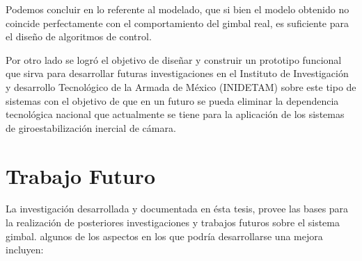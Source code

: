 Podemos concluir en lo referente al modelado, que si bien el modelo obtenido no coincide perfectamente con el comportamiento del gimbal real, es suficiente para el dise\~{n}o de algoritmos de control. 

Por otro lado se logr\'{o} el objetivo de dise\~{n}ar y construir un prototipo funcional que sirva para desarrollar futuras investigaciones en el Instituto de Investigaci\'{o}n y desarrollo Tecnol\'{o}gico de la Armada de M\'{e}xico (INIDETAM) sobre este tipo de sistemas con el objetivo de que en un futuro se pueda eliminar la dependencia tecnol\'{o}gica nacional que actualmente se tiene para la aplicaci\'{o}n de los sistemas de giroestabilizaci\'{o}n inercial de c\'{a}mara.
\newpage

\section{Trabajo Futuro}

La investigaci\'{o}n desarrollada y documentada en \'{e}sta tesis, provee las bases para la realizaci\'{o}n de posteriores investigaciones y trabajos futuros sobre el sistema gimbal. algunos de los aspectos en los que podr\'{i}a desarrollarse una mejora incluyen:

